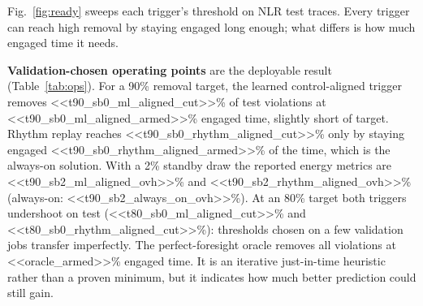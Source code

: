 \documentclass[11pt]{article}
\begin{document}
Fig.~\ref{fig:ready} sweeps each trigger's threshold on NLR test traces. Every trigger can reach high
removal by staying engaged long enough; what differs is how much engaged time it needs.

\textbf{Validation-chosen operating points} are the deployable result (Table~\ref{tab:ops}). For a 90\%
removal target, the learned control-aligned trigger removes <<t90_sb0_ml_aligned_cut>>\% of test violations
at <<t90_sb0_ml_aligned_armed>>\% engaged time, slightly short of target. Rhythm replay reaches
<<t90_sb0_rhythm_aligned_cut>>\% only by staying engaged <<t90_sb0_rhythm_aligned_armed>>\% of the time,
which is the always-on solution. With a 2\% standby draw the reported energy metrics are
<<t90_sb2_ml_aligned_ovh>>\% and <<t90_sb2_rhythm_aligned_ovh>>\% (always-on: <<t90_sb2_always_on_ovh>>\%).
At an 80\% target both triggers undershoot on test (<<t80_sb0_ml_aligned_cut>>\% and
<<t80_sb0_rhythm_aligned_cut>>\%): thresholds chosen on a few validation jobs transfer imperfectly. The
perfect-foresight oracle removes all violations at <<oracle_armed>>\% engaged time. It is an iterative
just-in-time heuristic rather than a proven minimum, but it indicates how much better prediction could
still gain.
\end{document}
